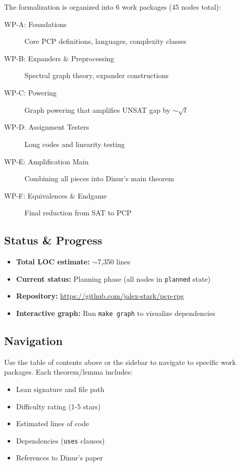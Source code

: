 \documentclass[a4paper]{report}
\begin{document}
The formalization is organized into 6 work packages (45 nodes total):

\begin{description}
\item[WP-A: Foundations] Core PCP definitions, languages, complexity classes
\item[WP-B: Expanders \& Preprocessing] Spectral graph theory, expander constructions
\item[WP-C: Powering] Graph powering that amplifies UNSAT gap by $\sim\sqrt{t}$
\item[WP-D: Assignment Testers] Long codes and linearity testing
\item[WP-E: Amplification Main] Combining all pieces into Dinur's main theorem
\item[WP-F: Equivalences \& Endgame] Final reduction from SAT to PCP
\end{description}

\subsection*{Status \& Progress}

\begin{itemize}
\item \textbf{Total LOC estimate:} $\sim$7,350 lines
\item \textbf{Current status:} Planning phase (all nodes in \texttt{planned} state)
\item \textbf{Repository:} \url{https://github.com/jalex-stark/pcp-rpg}
\item \textbf{Interactive graph:} Run \texttt{make graph} to visualize dependencies
\end{itemize}

\subsection*{Navigation}

Use the table of contents above or the sidebar to navigate to specific work packages. Each theorem/lemma includes:
\begin{itemize}
\item Lean signature and file path
\item Difficulty rating (1-5 stars)
\item Estimated lines of code
\item Dependencies (\texttt{uses} clauses)
\item References to Dinur's paper
\end{itemize}

\tableofcontents


\end{document}
